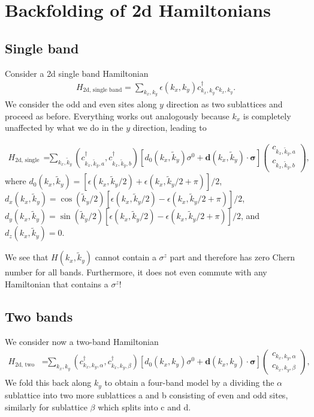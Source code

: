 \documentclass[english]{scrartcl}
\begin{document}
\section{Backfolding of 2d Hamiltonians}
\subsection{Single band}
Consider a \gls{2d} single band Hamiltonian
\begin{align}
H_\text{2d, single band} = \sum_{k_x, k_y} \epsilon(k_x, k_y) c^\dagger_{k_x, k_y} c_{k_x, k_y}. \label{Eqn:H2d_single_band}
\end{align}
We consider the odd and even sites along $y$ direction as two sublattices and proceed as before. Everything works out analogously because $k_x$ is completely unaffected by what we do in the $y$ direction, leading to 

\begin{align*}
H_\text{2d, single band} =& \sum_{k_x, \tilde k_y} \left(c^\dagger_{k_x, \tilde k_y, a}, c^\dagger_{k_x, \tilde k_y, b}\right) 
\left[ d_0(k_x, \tilde k_y) \sigma^0 + \bm d(k_x, \tilde k_y) \cdot \bm \sigma \right] 
\begin{pmatrix}
c_{k_x, \tilde k_y, a} \\
c_{k_x, \tilde k_y, b}
\end{pmatrix},
\end{align*}
where $d_0(k_x, \tilde k_y) = [\epsilon(k_x, \tilde k_y / 2) + \epsilon(k_x, \tilde k_y / 2 + \pi)] / 2$, $d_x(k_x, \tilde k_y) = \cos(\tilde k_y /2)[\epsilon(k_x, \tilde k_y / 2) - \epsilon(k_x, \tilde k_y / 2 + \pi)] / 2$, $d_y(k_x, \tilde k_y) = \sin(\tilde k_y /2)[\epsilon(k_x, \tilde k_y / 2) - \epsilon(k_x,\tilde k_y / 2 + \pi)] / 2$, and $d_z(k_x, \tilde k_y) = 0$. 

We see that $H(k_x, \tilde k_y)$ cannot contain a $\sigma^z$ part and therefore has zero Chern number for all bands. Furthermore, it does not even commute with any Hamiltonian that contains a $\sigma^z$!

\subsection{Two bands}
We consider now a two-band Hamiltonian 
\begin{align*}
H_\text{2d, two band} =& \sum_{k_x, k_y} \left(c^\dagger_{k_x, k_y, \alpha}, c^\dagger_{k_x, k_y, \beta}\right) 
\left[ d_0(k_x, k_y) \sigma^0 + \bm d(k_x, k_y) \cdot \bm \sigma \right] 
\begin{pmatrix}
c_{k_x, k_y, \alpha} \\
c_{k_x, k_y, \beta}
\end{pmatrix},
\end{align*}
We fold this back along $k_y$ to obtain a four-band model by a dividing the $\alpha$ sublattice  into two more sublattices a and b consisting of even and odd sites, similarly for sublattice $\beta$ which splits into c and d.
\end{document}
